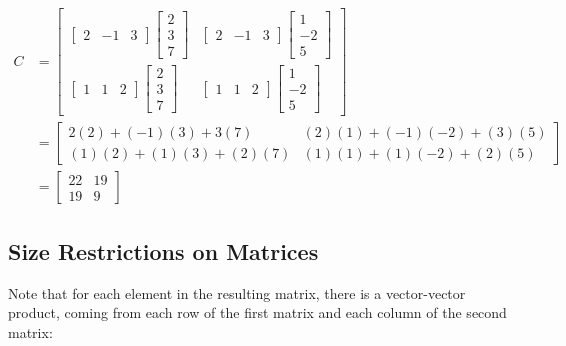 \begin{example}
\begin{align*}
C & =
\begin{bmatrix}
\begin{bmatrix}
 2  & -1 & 3
\end{bmatrix}
\begin{bmatrix}
2 \\ 3 \\ 7
\end{bmatrix}
&
\begin{bmatrix}
2 & -1 & 3
\end{bmatrix}
\begin{bmatrix}
1 \\ -2 \\ 5
\end{bmatrix} \\
\begin{bmatrix}
1 & 1 & 2
\end{bmatrix}
\begin{bmatrix}
2 \\ 3 \\ 7
\end{bmatrix}
&
\begin{bmatrix}
1 & 1 & 2
\end{bmatrix}
\begin{bmatrix}
1 \\ -2 \\ 5
\end{bmatrix}
\end{bmatrix}
 \\
& =
\begin{bmatrix}
2(2) + (-1)(3) + 3(7) & (2)(1) + (-1)(-2) + (3)(5) \\
(1)(2) + (1)(3) +(2)(7) & (1)(1) + (1)(-2) + (2)(5)
\end{bmatrix} \\
& = \begin{bmatrix}
22 & 19 \\ 19 & 9
\end{bmatrix}
\end{align*}

\end{example}

\subsection{Size Restrictions on Matrices}

Note that for each element in the resulting matrix, there is a vector-vector product, coming from each row of the first matrix and each column of the second matrix:

